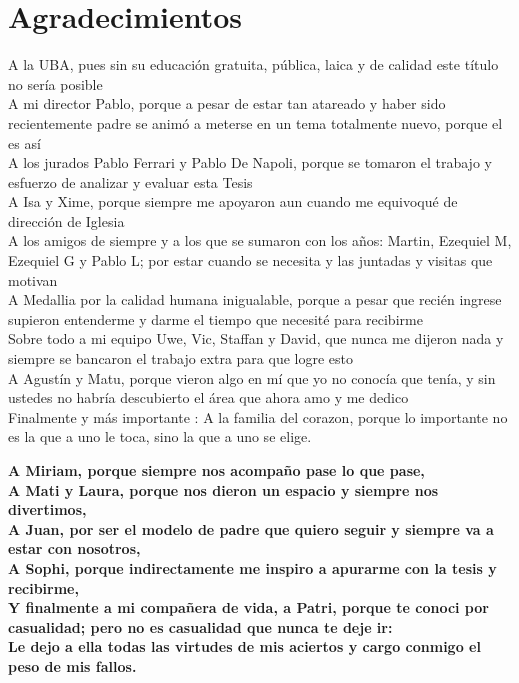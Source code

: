 
\bigskip

\begingroup
\let\clearpage\relax
\let\cleardoublepage\relax
\let\cleardoublepage\relax
\chapter*{Agradecimientos}

\begin{center}
A la UBA, pues sin su educaci\'on gratuita, p\'ublica, laica y de calidad este t\'itulo no ser\'ia posible \\
A mi director Pablo, porque a pesar de estar tan atareado y haber sido recientemente padre se anim\'o a meterse en un tema totalmente nuevo, porque el es as\'i \\
A los jurados Pablo Ferrari y Pablo De Napoli, porque se tomaron el trabajo y esfuerzo de analizar y evaluar esta Tesis \\
A Isa y Xime, porque siempre me apoyaron aun cuando me equivoqu\'e de direcci\'on de Iglesia \\
A los amigos de siempre y a los que se sumaron con los a\~nos: Martin, Ezequiel M, Ezequiel G y Pablo L; por estar cuando se necesita y las juntadas y visitas que motivan \\
A Medallia por la calidad humana inigualable, porque a pesar que reci\'en ingrese supieron entenderme y darme el tiempo que necesit\'e para recibirme \\
Sobre todo a mi equipo Uwe, Vic, Staffan y David, que nunca me dijeron nada y siempre se bancaron el trabajo extra para que logre esto \\
A Agust\'in y Matu, porque vieron algo en m\'i que yo no conoc\'ia que ten\'ia, y sin ustedes no habr\'ia descubierto el \'area que ahora amo y me dedico \\
Finalmente y m\'as importante : A la familia del corazon, porque lo importante no es la que a uno le toca, sino la que a uno se elige.
\linebreak
\linebreak

\textbf{
A Miriam, porque siempre nos acompa\~no pase lo que pase, \\
A Mati y Laura, porque nos dieron un espacio y siempre nos divertimos, \\
A Juan, por ser el modelo de padre que quiero seguir y siempre va a estar con nosotros, \\
A Sophi, porque indirectamente me inspiro a apurarme con la tesis y recibirme, \\
Y finalmente a mi compa\~nera de vida, a Patri, porque te conoci por casualidad; pero no es casualidad que nunca te deje ir: \\
Le dejo a ella todas las virtudes de mis aciertos y cargo conmigo el peso de mis fallos.
}
\end{center}
\endgroup



